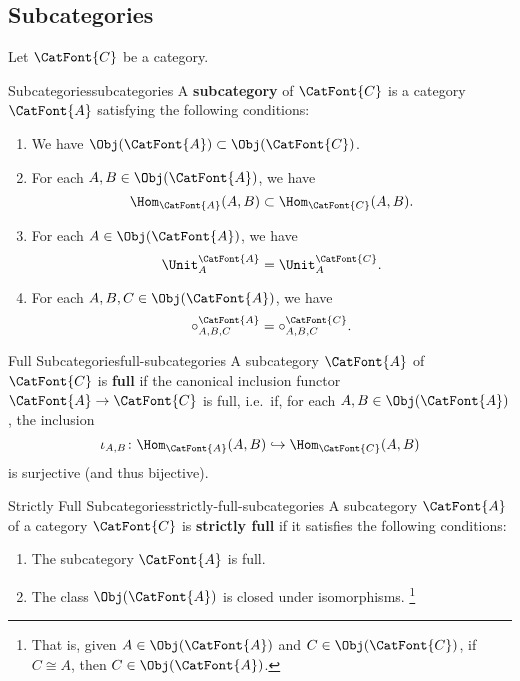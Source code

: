 \subsection{Subcategories}\label{subsection-subcategories}
Let $\CatFont{C}$ be a category.
\begin{definition}{Subcategories}{subcategories}%
    A \textbf{subcategory} of $\CatFont{C}$ is a category $\CatFont{A}$ satisfying the following conditions:
    \begin{enumerate}
        \item{}We have $\Obj(\CatFont{A})\subset\Obj(\CatFont{C})$.
        \item{}For each $A,B\in\Obj(\CatFont{A})$, we have
            \[
                \Hom_{\CatFont{A}}(A,B)
                \subset
                \Hom_{\CatFont{C}}(A,B).
            \]
        \item{}For each $A\in\Obj(\CatFont{A})$, we have
            \[
                \Unit^{\CatFont{A}}_{A}
                =
                \Unit^{\CatFont{C}}_{A}.
            \]%
        \item{}For each $A,B,C\in\Obj(\CatFont{A})$, we have
            \[
                \circ^{\CatFont{A}}_{A,B,C}
                =
                \circ^{\CatFont{C}}_{A,B,C}.
            \]%
    \end{enumerate}
\end{definition}
\begin{definition}{Full Subcategories}{full-subcategories}%
    A subcategory $\CatFont{A}$ of $\CatFont{C}$ is \textbf{full} if the canonical inclusion functor $\CatFont{A}\to\CatFont{C}$ is full, i.e.\ if, for each $A,B\in\Obj(\CatFont{A})$, the inclusion
    \[
        \iota_{A,B}%
        \colon%
        \Hom_{\CatFont{A}}(A,B)%
        \hookrightarrow%
        \Hom_{\CatFont{C}}(A,B)%
    \]%
    is surjective (and thus bijective).
\end{definition}
\begin{definition}{Strictly Full Subcategories}{strictly-full-subcategories}%
    A subcategory $\CatFont{A}$ of a category $\CatFont{C}$ is \textbf{strictly full} if it satisfies the following conditions:
    \begin{enumerate}
        \item{}The subcategory $\CatFont{A}$ is full.
        \item{}The class $\Obj(\CatFont{A})$ is closed under isomorphisms.%
            \footnote{%
                That is, given $A\in\Obj(\CatFont{A})$ and $C\in\Obj(\CatFont{C})$, if $C\cong A$, then $C\in\Obj(\CatFont{A})$.%
                \par\vspace*{-1.75\baselineskip}
            }%
    \end{enumerate}
\end{definition}
